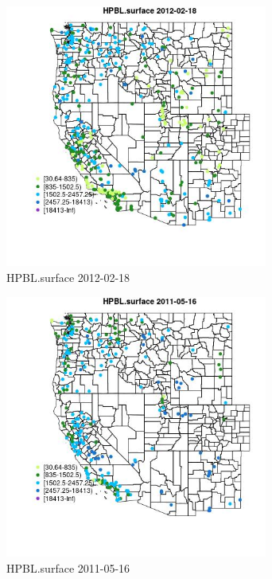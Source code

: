 \begin{figure} 
\centering  
\includegraphics[width=0.77\textwidth]{Code_Outputs/Report_ML_input_PM25_Step4_part_f_de_duplicated_aveswNAs_MapObsHPBLsurface2012-02-18.jpg} 
\caption{\label{fig:Report_ML_input_PM25_Step4_part_f_de_duplicated_aveswNAsMapObsHPBLsurface2012-02-18}HPBL.surface 2012-02-18} 
\end{figure} 
 

\begin{figure} 
\centering  
\includegraphics[width=0.77\textwidth]{Code_Outputs/Report_ML_input_PM25_Step4_part_f_de_duplicated_aveswNAs_MapObsHPBLsurface2011-05-16.jpg} 
\caption{\label{fig:Report_ML_input_PM25_Step4_part_f_de_duplicated_aveswNAsMapObsHPBLsurface2011-05-16}HPBL.surface 2011-05-16} 
\end{figure} 
 

